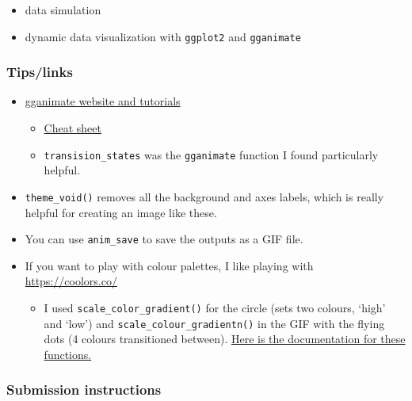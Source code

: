 \documentclass[
  openany]{book}
\providecommand{\tightlist}{%
  \setlength{\itemsep}{0pt}\setlength{\parskip}{0pt}}
\begin{document}
\begin{itemize}
\tightlist
\item
  data simulation
\item
  dynamic data visualization with \texttt{ggplot2} and \texttt{gganimate}
\end{itemize}

\hypertarget{tipslinks}{%
\subsubsection{Tips/links}\label{tipslinks}}

\begin{itemize}
\item
  \href{https://gganimate.com/articles/gganimate.html}{gganimate website and tutorials}

  \begin{itemize}
  \item
    \href{https://ugoproto.github.io/ugo_r_doc/pdf/gganimate.pdf}{Cheat sheet}
  \item
    \texttt{transision\_states} was the \texttt{gganimate} function I found particularly helpful.
  \end{itemize}
\item
  \texttt{theme\_void()} removes all the background and axes labels, which is really helpful for creating an image like these.
\item
  You can use \texttt{anim\_save} to save the outputs as a GIF file.
\item
  If you want to play with colour palettes, I like playing with \url{https://coolors.co/}

  \begin{itemize}
  \tightlist
  \item
    I used \texttt{scale\_color\_gradient()} for the circle (sets two colours, `high' and `low') and \texttt{scale\_colour\_gradientn()} in the GIF with the flying dots (4 colours transitioned between). \href{https://ggplot2.tidyverse.org/reference/scale_gradient.html}{Here is the documentation for these functions.}
  \end{itemize}
\end{itemize}

\hypertarget{submission-instructions-3}{%
\subsubsection{Submission instructions}\label{submission-instructions-3}}
\end{document}
